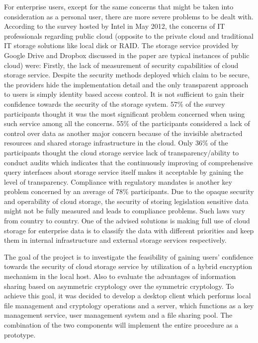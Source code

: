 For enterprise users, except for the same concerns that might be taken into consideration as a personal user, there are more severe problems to be dealt with. According to the survey hosted by Intel in May 2012\cite{Intel2012}, the concerns of IT professionals regarding public cloud (opposite to the private cloud and traditional IT storage solutions like local disk or RAID. The storage service provided by Google Drive and Dropbox discussed in the paper are typical instances of public cloud) were: Firstly, the lack of measurement of security capabilities of cloud storage service. Despite the security methods deployed which claim to be secure, the providers hide the implementation detail and the only transparent approach to users is simply identity based access control. It is not sufficient to gain their confidence towards the security of the storage system. 57\% of the survey participants thought it was the most significant problem concerned when using such service among all the concerns. 55\% of the participants considered a lack of control over data as another major concern because of the invisible abstracted resources and shared storage infrastructure in the cloud. Only 36\% of the participants thought the cloud storage service lack of transparency/ability to conduct audits which indicates that the continuously improving of comprehensive query interfaces about storage service itself makes it acceptable by gaining the level of transparency. Compliance with regulatory mandates is another key problem concerned by an average of 78\% participants. Due to the opaque security and operability of cloud storage, the security of storing legislation sensitive data might not be fully measured and leads to compliance problems. Such laws vary from country to country. One of the advised solutions is making full use of cloud storage for enterprise data is to classify the data with different priorities and keep them in internal infrastructure and external storage services respectively.

The goal of the project is to investigate the feasibility of gaining users’ confidence towards the security of cloud storage service by utilization of a hybrid encryption mechanism in the local host. Also to evaluate the advantages of information sharing based on asymmetric cryptology over the symmetric cryptology. To achieve this goal, it was decided to develop a desktop client which performs local file management and cryptology operations and a server, which functions as a key management service, user management system and a file sharing pool. The combination of the two components will implement the entire procedure as a prototype.

